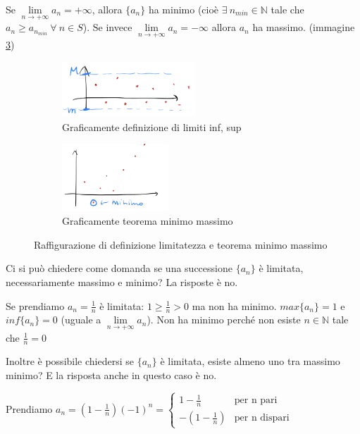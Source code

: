 \begin{theorem}
Se $\lim\limits_{n\to +\infty}a_n = +\infty$, allora $\{a_n\}$ ha minimo (cioè $\exists \:n_{min} \in \mathbb{N}$ tale che $a_n \geq a_{n_{min}} \: \forall \:n \in S$). Se invece $\lim\limits_{n\to +\infty}a_n = -\infty$ allora $a_n$ ha massimo.  (immagine \ref{teorema-minimo})
\end{theorem}
\begin{figure}[h!]
\centering
\begin{subfigure}{.45\textwidth}
    \vspace{-25pt}
    \centering
    \includegraphics[width=5cm]{images/limitatezza-successioni.png}
    \caption{Graficamente definizione di limiti inf, sup}
    \label{limitatezza-successioni}
\end{subfigure}
\begin{subfigure}{.45\textwidth}
    \vspace{-15pt}
    \centering
    \includegraphics[width=4cm]{images/teorema-minimo.png}
    \caption{Graficamente teorema minimo massimo}
    \label{teorema-minimo}
\end{subfigure}
\caption{Raffigurazione di definizione limitatezza e teorema minimo massimo}
\end{figure}
\hspace{-15pt}Ci si può chiedere come domanda se una successione $\{a_n\}$ è limitata, necessariamente massimo e minimo? La risposte è no.
\begin{example}
Se prendiamo $a_n = \frac{1}{n}$ è limitata: $1 \geq \frac{1}{n} > 0$ ma non ha minimo. $max\{a_n\} = 1$ e $inf\{a_n\} = 0$ (uguale a $\lim\limits_{n\to +\infty} a_n$). Non ha minimo perché non esiste $n \in \mathbb{N}$ tale che $\frac{1}{n} = 0$
\end{example}
\hspace{-15pt}Inoltre è possibile chiedersi se $\{a_n\}$ è limitata, esiste almeno uno tra massimo minimo? E la risposta anche in questo caso è no.
\begin{example}
Prendiamo $a_n = (1-\frac{1}{n})(-1)^n = \begin{cases}1-\frac{1}{n} & \text{per n pari} \\ -(1 - \frac{1}{n}) & \text{per n dispari}\end{cases}$
\end{example}
